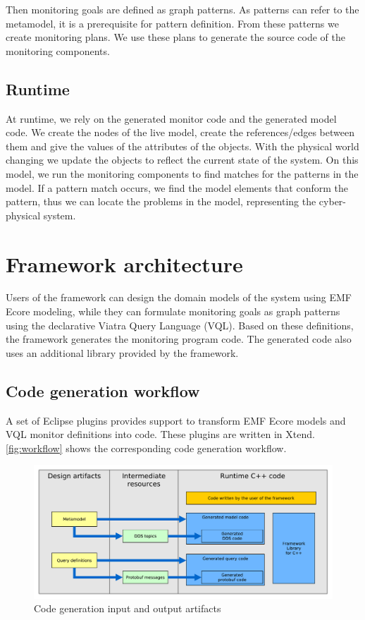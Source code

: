 Then monitoring goals are defined as graph patterns. 
As patterns can refer to the metamodel, it is a prerequisite for pattern definition. 
From these patterns we create monitoring plans. 
We use these plans to generate the source code of the monitoring components.

\subsection{Runtime}

At runtime, we rely on the generated monitor code and the generated model code. 
We create the nodes of the live model, create the references/edges between them and give the values of the attributes of the objects. 
With the physical world changing we update the objects to reflect the current state of the system. 
On this model, we run the monitoring components to find matches for the patterns in the model. 
If a pattern match occurs, we find the model elements that conform the pattern, thus we can locate the problems in the model, representing the cyber-physical system.


\section{Framework architecture}

Users of the framework can design the domain models of the system using EMF Ecore modeling, while they can formulate monitoring goals as graph patterns using the declarative Viatra Query Language (VQL).
Based on these definitions, the framework generates the monitoring \cpp{} program code.
The generated code also uses an additional library provided by the framework.

\subsection{Code generation workflow}
A set of Eclipse plugins provides support to transform EMF Ecore models and VQL monitor definitions into \cpp{} code. 
These plugins are written in Xtend.
\autoref{fig:workflow} shows the corresponding code generation workflow.

\begin{figure}[H]
	\begin{center}
		\includegraphics[width=\textwidth]{figures/workflow.pdf}
		\caption{Code generation input and output artifacts}
		\label{fig:workflow}
	\end{center}
\end{figure}

